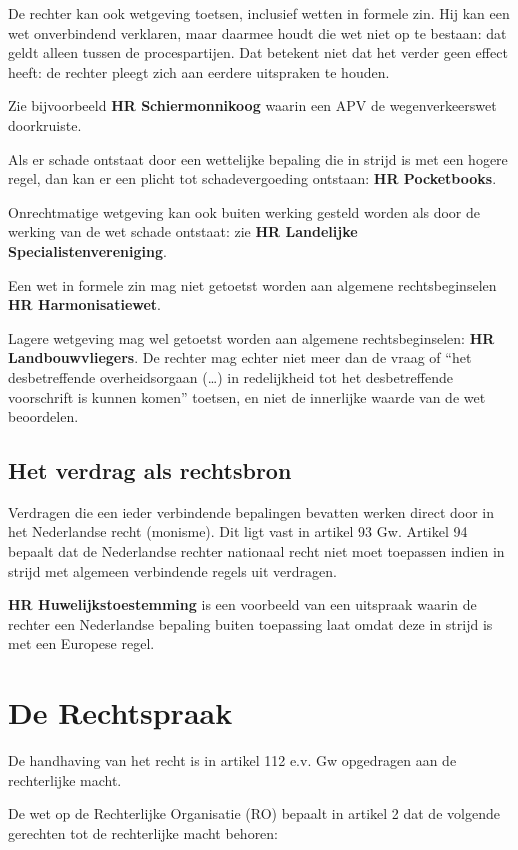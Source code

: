 \documentclass{article}
\begin{document}
De rechter kan ook wetgeving toetsen, inclusief wetten in formele zin. Hij kan
een wet onverbindend verklaren, maar daarmee houdt die wet niet op te bestaan:
dat geldt alleen tussen de procespartijen. Dat betekent niet dat het verder
geen effect heeft: de rechter pleegt zich aan eerdere uitspraken te houden.

Zie bijvoorbeeld \textbf{HR Schiermonnikoog} waarin een APV de wegenverkeerswet
doorkruiste.

Als er schade ontstaat door een wettelijke bepaling die in strijd is met een
hogere regel, dan kan er een plicht tot schadevergoeding ontstaan: \textbf{HR
Pocketbooks}.

Onrechtmatige wetgeving kan ook buiten werking gesteld worden als door de
werking van de wet schade ontstaat: zie \textbf{HR Landelijke
Specialistenvereniging}.

Een wet in formele zin mag niet getoetst worden aan algemene rechtsbeginselen
\textbf{HR Harmonisatiewet}.

Lagere wetgeving mag wel getoetst worden aan algemene rechtsbeginselen:
\textbf{HR Landbouwvliegers}. De rechter mag echter niet meer dan de vraag of
``het desbetreffende overheidsorgaan (\ldots) in redelijkheid tot het
desbetreffende voorschrift is kunnen komen'' toetsen, en niet de innerlijke
waarde van de wet beoordelen.


\subsection{Het verdrag als rechtsbron}

Verdragen die een ieder verbindende bepalingen bevatten werken direct
door in het Nederlandse recht (monisme). Dit ligt vast in artikel 93 Gw.
Artikel 94 bepaalt dat de Nederlandse rechter nationaal recht niet moet
toepassen indien in strijd met algemeen verbindende regels uit verdragen.

\textbf{HR Huwelijkstoestemming} is een voorbeeld van een uitspraak waarin de
rechter een Nederlandse bepaling buiten toepassing laat omdat deze in strijd is
met een Europese regel.

\section{De Rechtspraak}

De handhaving van het recht is in artikel 112 e.v. Gw opgedragen aan de
rechterlijke macht.

De wet op de Rechterlijke Organisatie (RO) bepaalt in artikel 2 dat de volgende
gerechten tot de rechterlijke macht behoren:
\end{document}

